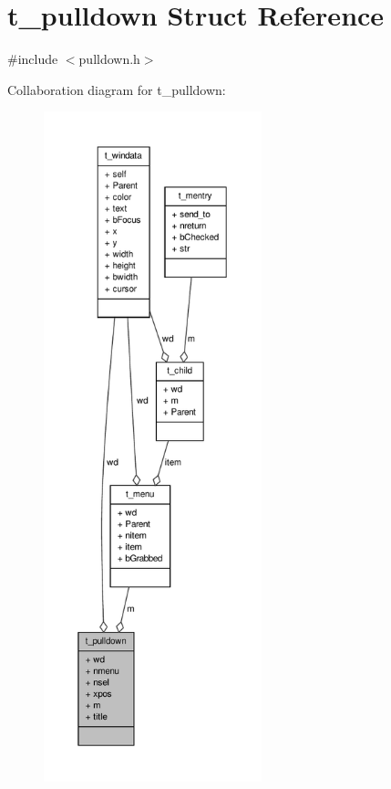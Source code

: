 \hypertarget{structt__pulldown}{\section{t\-\_\-pulldown \-Struct \-Reference}
\label{structt__pulldown}
}


{\ttfamily \#include $<$pulldown.\-h$>$}



\-Collaboration diagram for t\-\_\-pulldown\-:
\nopagebreak
\begin{figure}[H]
\begin{center}
\leavevmode
\includegraphics[height=550pt]{structt__pulldown__coll__graph}
\end{center}
\end{figure}
